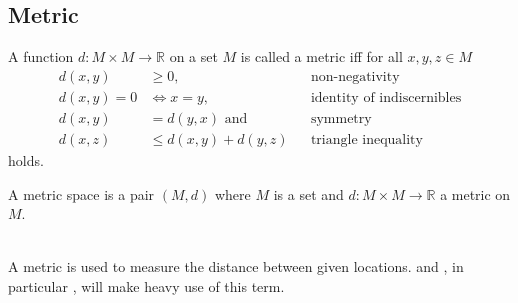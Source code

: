 \subsection{Metric}
	\begin{mydef}\label{metric}
		A function $d: M \times M \to \mathbb{R}$ on a set $M$ is called a \textnormal{metric} iff for all $x, y, z \in M$
		\begin{align*}
			d(x, y)	&\ge 0,			&&\text{non-negativity}\\
			d(x, y) = 0	&\Leftrightarrow x = y,	&&\text{identity of indiscernibles}\\
			d(x, y)	&= d(y, x) \text{ and }	&&\text{symmetry}\\
			d(x, z)	&\le d(x, y) + d(y, z)	&&\text{triangle inequality}
		\end{align*}
		holds.
	\end{mydef}
	\begin{mydef}\label{metricSpace}
		A \textnormal{metric space} is a pair $(M, d)$ where $M$ is a set
		and $d: M \times M \to \mathbb{R}$ a metric on $M$.
	\end{mydef}\quad\\
	A metric is used to measure the distance between given locations. 
	and , in particular , will make heavy use of this term.
	
